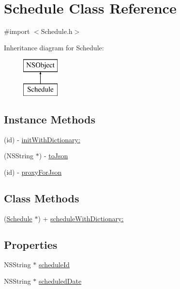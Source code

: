 \hypertarget{interface_schedule}{\section{Schedule Class Reference}
\label{interface_schedule}
}


{\ttfamily \#import $<$Schedule.\-h$>$}

Inheritance diagram for Schedule\-:\begin{figure}[H]
\begin{center}
\leavevmode
\includegraphics[height=2.000000cm]{interface_schedule}
\end{center}
\end{figure}
\subsection*{Instance Methods}
\begin{DoxyCompactItemize}
\item 
(id) -\/ \hyperlink{interface_schedule_aff4295174b2b8721744bb3e679fe5af6}{init\-With\-Dictionary\-:}
\item 
(N\-S\-String $\ast$) -\/ \hyperlink{interface_schedule_a4b1c8b2af555bbf9c12097220bd2d57a}{to\-Json}
\item 
(id) -\/ \hyperlink{interface_schedule_ab513221e2c84e59d480502bf9175c3c8}{proxy\-For\-Json}
\end{DoxyCompactItemize}
\subsection*{Class Methods}
\begin{DoxyCompactItemize}
\item 
(\hyperlink{interface_schedule}{Schedule} $\ast$) + \hyperlink{interface_schedule_a31637536928d47ae9683bcb1943bfaf2}{schedule\-With\-Dictionary\-:}
\end{DoxyCompactItemize}
\subsection*{Properties}
\begin{DoxyCompactItemize}
\item 
N\-S\-String $\ast$ \hyperlink{interface_schedule_a00b1ae8330675f0890f917abfdbef460}{schedule\-Id}
\item 
N\-S\-String $\ast$ \hyperlink{interface_schedule_a0e55944a0eac854b9e8eb185fc2766e2}{scheduled\-Date}
\end{DoxyCompactItemize}


